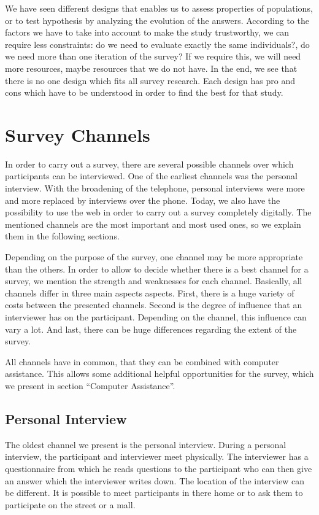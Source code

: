 \documentclass{report}
\begin{document}
We have seen different designs that enables us to assess properties of populations, or to test hypothesis by analyzing the evolution of the answers. According to the factors we have to take into account to make the study trustworthy, we can require less constraints: do we need to evaluate exactly the same individuals?, do we need more than one iteration of the survey? If we require this, we will need more resources, maybe resources that we do not have. In the end, we see that there is no one design which fits all survey research. Each design has pro and cons which have to be understood in order to find the best for that study.

\chapter{Survey Channels}
In order to carry out a survey, there are several possible channels over which participants can be interviewed. One of the earliest channels was the personal interview. With the broadening of the telephone, personal interviews were more and more replaced by interviews over the phone. Today, we also have the possibility to use the web in order to carry out a survey completely digitally. The mentioned channels are the most important and most used ones, so we explain them in the following sections.

Depending on the purpose of the survey, one channel may be more appropriate than the others. In order to allow to decide whether there is a best channel for a survey, we mention the strength and weaknesses for each channel. Basically, all channels differ in three main aspects aspects. First, there is a huge variety of costs between the presented channels. Second is the degree of influence that an interviewer has on the participant. Depending on the channel, this influence can vary a lot. And last, there can be huge differences regarding the extent of the survey.

All channels have in common, that they can be combined with computer assistance. This allows some additional helpful opportunities for the survey, which we present in section “Computer Assistance”.


\section{Personal Interview}

The oldest channel we present is the personal interview. During a personal interview, the participant and interviewer meet physically. The interviewer has a questionnaire from which he reads questions to the participant who can then give an answer which the interviewer writes down. The location of the interview can be different. It is possible to meet participants in there home or to ask them to participate on the street or a mall.
\end{document}
